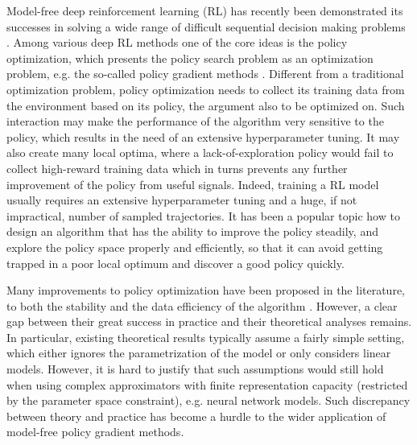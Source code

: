 Model-free deep reinforcement learning (RL) has recently been demonstrated its successes in solving a wide range of difficult sequential decision making problems \citep{schulman2015trust,mnih2015human,silver2016mastering}.
Among various deep RL methods one of the core ideas is the policy optimization, which presents the policy search problem as an optimization problem, e.g. the so-called policy gradient methods \citep{williams1991function,williams1992simple,sutton1998reinforcement}.
Different from a traditional optimization problem, policy optimization needs to collect its training data from the environment based on its policy, the argument also to be optimized on.
Such interaction may make the performance of the algorithm very sensitive to the policy, which results in the need of an extensive hyperparameter tuning.
It may also create many local optima, where a lack-of-exploration policy would fail to collect high-reward training data which in turns prevents any further improvement of the policy from useful signals.
Indeed, training a RL model usually requires an extensive hyperparameter tuning and a huge, if not impractical, number of sampled trajectories. 
It has been a popular topic how to design an algorithm that has
the ability to improve the policy steadily, and explore the policy space properly and efficiently, so that it can avoid getting trapped in a poor local optimum and discover a good policy quickly.

Many improvements to policy optimization have been proposed in the literature, to both the stability and the data efficiency of the algorithm \citep{peters2010relative,van2015learning,fox2015taming,schulman2015trust,montgomery2016guided,nachum2017bridging,nachum2017trust,tangkaratt2017guide,abdolmaleki2018maximum,haarnoja2018soft}. 
However, a clear gap between their great success in practice and their theoretical analyses remains.
In particular, existing theoretical results typically assume a fairly simple setting, which either ignores the parametrization of the model or only considers linear models. However, it is hard to justify that such assumptions would still hold when using complex approximators with finite representation capacity (restricted by the parameter space constraint), e.g. neural network models.
Such discrepancy between theory and practice has become a hurdle to the wider application of model-free policy gradient methods. 

